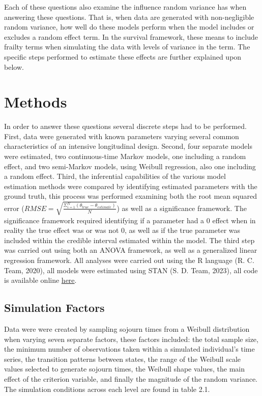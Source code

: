 \documentclass[12pt]{./styles/outhesis}
\begin{document}
Each of these questions also examine the influence random variance has
when answering these questions. That is, when data are generated with
non-negligible random variance, how well do these models perform when
the model includes or excludes a random effect term. In the survival
framework, these means to include frailty terms when simulating the data
with levels of variance in the term. The specific steps performed to
estimate these effects are further explained upon below.

\section{Methods}
In order to answer these questions several discrete steps had to be
performed. First, data were generated with known parameters varying
several common characteristics of an intensive longitudinal design.
Second, four separate models were estimated, two continuous-time Markov
models, one including a random effect, and two semi-Markov models, using
Weibull regression, also one including a random effect. Third, the
inferential capabilities of the various model estimation methods were
compared by identifying estimated parameters with the ground truth, this
process was performed examining both the root mean squared error
(\(RMSE = \sqrt{\frac{\Sigma_{i=1}^N(\theta_{true}-\theta_{estimate})}{N}}\))
as well as a significance framework. The significance framework required
identifying if a parameter had a 0 effect when in reality the true
effect was or was not 0, as well as if the true parameter was included
within the credible interval estimated within the model. The third step
was carried out using both an ANOVA framework, as well as a generalized
linear regression framework. All analyses were carried out using the R
language (R. C. Team, 2020), all models were estimated using STAN (S. D.
Team, 2023), all code is available online
\href{https://github.com/adrose/dissertationSim}{here}.

\subsection{Simulation Factors}
Data were were created by sampling sojourn times from a Weibull
distribution when varying seven separate factors, these factors
included: the total sample size, the minimum number of observations
taken within a simulated individual's time series, the transition
patterns between states, the range of the Weibull scale values selected
to generate sojourn times, the Weibull shape values, the main effect of
the criterion variable, and finally the magnitude of the random
variance. The simulation conditions across each level are found in table 2.1.
\end{document}
